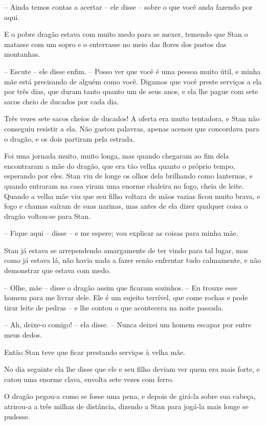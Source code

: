 -- Ainda temos contas a acertar -- ele disse -- sobre o que você anda
fazendo por aqui.

E o pobre dragão estava com muito medo para se mexer, temendo que Stan
o matasse com um sopro e o enterrasse no meio das flores dos pastos
das montanhas.

-- Escute -- ele disse enfim. -- Posso ver que você é uma pessoa muito
útil, e minha mãe está precisando de alguém como você. Digamos que
você preste serviços a ela por três dias, que duram tanto quanto um
de seus anos, e ela lhe pague com sete sacos cheio de ducados por
cada dia.

Três vezes sete sacos cheios de ducados! A oferta era muito tentadora,
e Stan não conseguiu resistir a ela. Não gastou palavras, apenas
acenou que concordava para o dragão, e os dois partiram pela estrada.

Foi uma jornada muito, muito longa, mas quando chegaram ao fim dela
encontraram a mãe do dragão, que era tão velha quanto o próprio
tempo, esperando por eles. Stan viu de longe os olhos dela brilhando
como lanternas, e quando entraram na casa viram uma enorme chaleira
no fogo, cheia de leite. Quando a velha mãe viu que seu filho voltara
de mãos vazias ficou muito brava, e fogo e chamas saíram de suas
narinas, mas antes de ela dizer qualquer coisa o dragão voltou-se
para Stan.

-- Fique aqui -- disse -- e me espere; vou explicar as coisas para minha
mãe.

Stan já estava se arrependendo amargamente de ter vindo para tal
lugar, mas como já estava lá, não havia nada a fazer senão enfrentar
tudo calmamente, e não demonstrar que estava com medo.

-- Olhe, mãe -- disse o dragão assim que ficaram sozinhos. -- Eu trouxe
esse homem para me livrar dele. Ele é um sujeito terrível, que come
rochas e pode tirar leite de pedras -- e lhe contou o que acontecera
na noite passada.

-- Ah, deixe-o comigo! -- ela disse. -- Nunca deixei um homem escapar por
entre meus dedos.

Então Stan teve que ficar prestando serviços à velha mãe.

No dia seguinte ela lhe disse que ele e seu filho deviam ver quem era
mais forte, e catou uma enorme clava, envolta sete vezes com ferro.

O dragão pegou-a como se fosse uma pena, e depois de girá-la sobre sua
cabeça, atrirou-a a três milhas de distância, dizendo a Stan para
jogá-la mais longe se pudesse.

